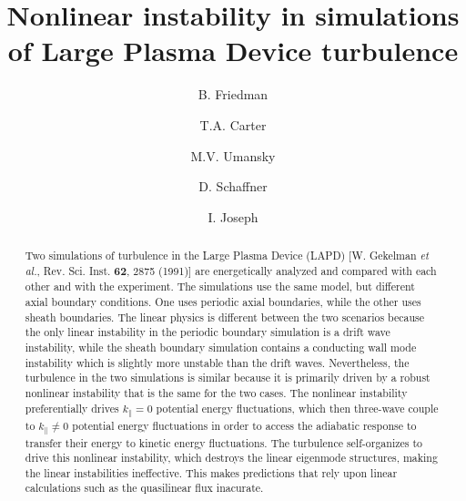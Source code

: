 \documentclass[showpacs,preprintnumbers,amsmath,amssymb,superscriptaddress,aip]{revtex4-1}
\begin{document}
\title{Nonlinear instability in simulations of Large Plasma Device turbulence}

\author{B. Friedman}

\author{T.A. Carter}


\author{M.V. Umansky}

\author{D. Schaffner}


\author{I. Joseph}





\begin{abstract}
Two simulations of turbulence in the Large Plasma Device (LAPD) [W. Gekelman \emph{et al.}, Rev. Sci. Inst. {\bf 62}, 2875 (1991)] are energetically analyzed and compared with each other
and with the experiment.
The simulations use the same model, but different axial boundary conditions. One uses periodic axial boundaries, while the other uses sheath boundaries. The linear physics is
different between the two scenarios because the only linear instability in the periodic boundary simulation is a drift wave instability, while the sheath boundary simulation
contains a conducting wall mode instability which is slightly more unstable than the drift waves. Nevertheless, the turbulence in the two simulations is similar because it is primarily
driven by a robust nonlinear instability that is the same for the two cases.
The nonlinear instability preferentially drives $k_\parallel = 0$ potential energy fluctuations, which
then three-wave couple to $k_\parallel \ne 0$ potential energy fluctuations in order to access the adiabatic response to transfer their energy to kinetic energy fluctuations.
The turbulence self-organizes to drive this nonlinear instability, which destroys the linear eigenmode structures, making the linear instabilities ineffective. This makes predictions that
rely upon linear calculations such as the quasilinear flux inacurate.
\end{abstract}

\maketitle
\end{document}
